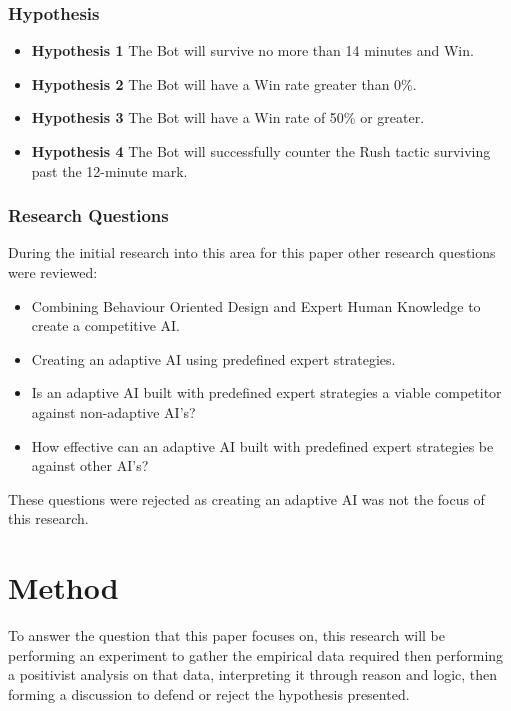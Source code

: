 \documentclass[journal]{IEEEtran}
\begin{document}
	\subsubsection{Hypothesis}
	\begin{itemize}
		\item \textbf{Hypothesis 1} The Bot will survive no more than 14 minutes and Win.
		\item \textbf{Hypothesis 2} The Bot will have a Win rate greater than 0\%.
		\item \textbf{Hypothesis 3} The Bot will have a Win rate of 50\% or greater.    
		\item \textbf{Hypothesis 4} The Bot will successfully counter the Rush tactic surviving past the 12-minute mark.
	\end{itemize}
	
	\subsubsection{Research Questions}
	During the initial research into this area for this paper other research questions were reviewed:
	\begin{itemize}
		\item Combining Behaviour Oriented Design and Expert Human Knowledge to create a competitive AI.
		
		\item Creating an adaptive AI using predefined expert strategies. 
		
		\item Is an adaptive AI built with predefined expert strategies a viable competitor against non-adaptive AI’s?
		
		\item How effective can an adaptive AI built with predefined expert strategies be against other AI’s?    
	\end{itemize}
	These questions were rejected as creating an adaptive AI was not the focus of this research.
	\newline
	
	\section{Method}
	To answer the question that this paper focuses on, this research will be performing an experiment to gather the empirical data required then performing a positivist analysis on that data, interpreting it through reason and logic, then forming a discussion to defend or reject the hypothesis presented.
	
\end{document}
